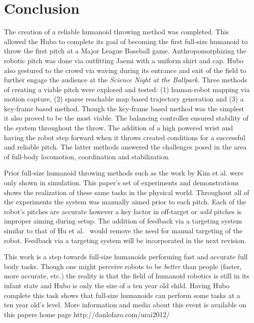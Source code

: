 \section{Conclusion}\label{sec:conclusion}
The creation of a reliable humanoid throwing method was completed. 
This allowed the Hubo to complete its goal of becoming the first full-size humanoid to throw the first pitch at a Major League Baseball game.
Anthropomorphizing the robotic pitch was done via outfitting Jaemi with a uniform shirt and cap.
Hubo also gestured to the crowd via waving during its entrance and exit of the field to further engage the audience at the \textit{Science Night at the Ballpark}.
Three methods of creating a viable pitch were explored and tested: (1) human-robot mapping via motion capture, (2) sparse reachable map based trajectory generation and (3) a key-frame based method.  
Though the key-frame based method was the simplest it also proved to be the most viable.  
The balancing controller ensured stability of the system throughout the throw.  
The addition of a high powered wrist and having the robot step forward when it throws created conditions for a successful and reliable pitch.
The latter methods answered the challenges posed in the area of full-body locomotion, coordination and stabilization.

Prior full-size humanoid throwing methods such as the work by Kim et al. \cite{5686315,JooH2011438} were only shown in simulation.
This paper's set of experiments and demonstrations shows the realization of these same tasks in the physical world.
Throughout all of the experiments the system was manually aimed prior to each pitch.
Each of the robot's pitches are accurate however a key factor in off-target or \textit{wild} pitches is improper aiming during setup.
The addition of feedback via a targeting system similar to that of Hu et al.~\cite{5649335} would remove the need for manual targeting of the robot.
Feedback via a targeting system will be incorporated in the next revision.

This work is a step towards full-size humanoids performing fast and accurate full body tasks.
Though one might perceive robots to be \textit{better} than people (faster, more accurate, etc.) the reality is that the field of humanoid robotics is still in its infant state and Hubo is only the size of a ten year old child.
Having Hubo complete this task shows that full-size humanoids can perform some tasks at a ten year old's level.
More information and media about this event is available on this papers home page http://danlofaro.com/urai2012/













